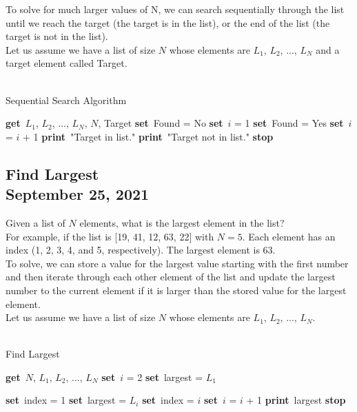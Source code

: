 \documentclass[]{article}
\newcommand{\Get}{\State \textbf{get}~}
\newcommand{\Set}{\State \textbf{set}~}
\newcommand{\Print}{\State \textbf{print}~}
\newcommand{\Stop}{\State \textbf{stop}~}
\begin{document}
To solve for much larger values of N, we can search sequentially through the list until we reach the target (the target is in the list), or the end of the list (the target is not in the list).\\

Let us assume we have a list of size $N$ whose elements are $L_1$, $L_2$, ..., $L_N$ and a target element called Target.

\begin{algorithm}
	\caption{\\Sequential Search Algorithm}
	\begin{algorithmic}[1]
		\Get $L_1$, $L_2$, ..., $L_N$, $N$, Target
		\Set Found = No
		\Set $i$ = 1
				\Set Found = Yes
			\Else
				\Set $i$ = $i$ + 1
			\EndIf
		\EndWhile
			\Print "Target in list."
		\Else
			\Print "Target not in list."
		\EndIf
		\Stop
	\end{algorithmic}
\end{algorithm}

\subsection{Find Largest\\ {\normalfont September 25, 2021}}
\bigbreak

Given a list of $N$ elements, what is the largest element in the list?\\

For example, if the list is [19, 41, 12, 63, 22] with $N = 5$. Each element has an index (1, 2, 3, 4, and 5, respectively). The largest element is 63.\\

To solve, we can store a value for the largest value starting with the first number and then iterate through each other element of the list and update the largest number to the current element if it is larger than the stored value for the largest element.\\

Let us assume we have a list of size $N$ whose elements are $L_1$, $L_2$, ..., $L_N$.

\begin{algorithm}
	\caption{\\Find Largest}
	\begin{algorithmic}[1]
		\Get $N$, $L_1$, $L_2$, ..., $L_N$
		\Set $i$ = 2
		\Set largest = $L_1$
	\end{algorithmic}
\end{algorithm}
\begin{algorithm}
	\begin{algorithmic}[1]
		\Set index = 1
				\Set largest = $L_i$
				\Set index = $i$
			\EndIf
			\Set $i$ = $i$ + 1
		\EndWhile
		\Print largest
		\Stop
	\end{algorithmic}
\end{algorithm}
\end{document}
